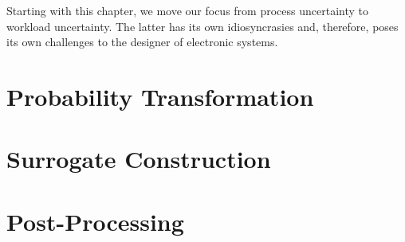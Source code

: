 Starting with this chapter, we move our focus from process uncertainty to
workload uncertainty. The latter has its own idiosyncrasies and, therefore,
poses its own challenges to the designer of electronic systems.

\section{\introductiontitle}

\section{\motivationtitle}

\section{\problemtitle}

\section{\pasttitle}

\section{\solutiontitle}

\section{Probability Transformation}

\section{Surrogate Construction}

\section{Post-Processing}

\section{\applicationtitle}

\section{\resultstitle}

\section{\conclusiontitle}
